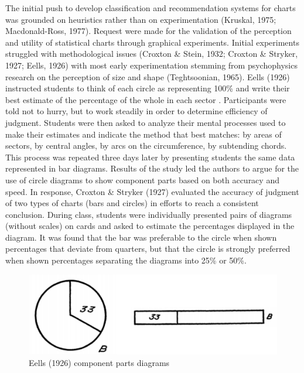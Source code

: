 \documentclass[print]{nuthesis}
\begin{document}
The initial push to develop classification and recommendation systems for charts was grounded on heuristics rather than on experimentation (Kruskal, 1975; Macdonald-Ross, 1977).
Request were made for the validation of the perception and utility of statistical charts through graphical experiments.
Initial experiments struggled with methodological issues (Croxton \& Stein, 1932; Croxton \& Stryker, 1927; Eells, 1926) with most early experimentation stemming from psychophysics research on the perception of size and shape (Teghtsoonian, 1965).
Eells (1926) instructed students to think of each circle as representing 100\% and write their best estimate of the percentage of the whole in each sector .
Participants were told not to hurry, but to work steadily in order to determine efficiency of judgment.
Students were then asked to analyze their mental processes used to make their estimates and indicate the method that best matches: by areas of sectors, by central angles, by arcs on the circumference, by subtending chords.
This process was repeated three days later by presenting students the same data represented in bar diagrams.
Results of the study led the authors to argue for the use of circle diagrams to show component parts based on both accuracy and speed.
In response, Croxton \& Stryker (1927) evaluated the accuracy of judgment of two types of charts (bars and circles) in efforts to reach a consistent conclusion.
During class, students were individually presented pairs of diagrams (without scales) on cards and asked to estimate the percentages displayed in the diagram.
It was found that the bar was preferable to the circle when shown percentages that deviate from quarters, but that the circle is strongly preferred when shown percentages separating the diagrams into 25\% or 50\%.

\begin{figure}[tbp]

{\centering \includegraphics[width=0.75\linewidth,]{images/eells-component-parts} 

}

\caption{Eells (1926) component parts diagrams}\label{fig:eells-compoment-parts}
\end{figure}
\end{document}
